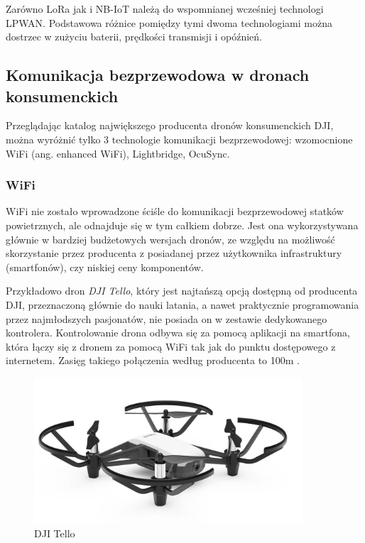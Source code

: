 \hspace{1cm}Zarówno LoRa jak i NB-IoT należą do wspomnianej wcześniej technologi LPWAN. Podstawowa różnice pomiędzy tymi dwoma technologiami można dostrzec w zużyciu baterii, prędkości transmisji i opóźnień.

\subsection{Komunikacja bezprzewodowa w dronach konsumenckich}
\hspace{1cm}Przeglądając katalog największego producenta dronów konsumenckich DJI, można wyróżnić tylko 3 technologie komunikacji bezprzewodowej: wzomocnione WiFi (ang. enhanced WiFi), Lightbridge, OcuSync.

\subsubsection{WiFi}
\hspace{1cm}WiFi nie zostało wprowadzone ściśle do komunikacji bezprzewodowej statków powietrznych, ale odnajduje się w tym całkiem dobrze. Jest ona wykorzystywana głównie w bardziej budżetowych wersjach dronów, ze względu na możliwość skorzystanie przez producenta z posiadanej przez użytkownika infrastruktury (smartfonów), czy niskiej ceny komponentów.

\hspace{1cm}Przykładowo dron \emph{DJI Tello}, który jest najtańszą opcją dostępną od producenta DJI, przeznaczoną głównie do nauki latania, a nawet praktycznie programowania przez najmłodszych pasjonatów, nie posiada on w zestawie dedykowanego kontrolera. Kontrolowanie drona odbywa się za pomocą aplikacji na smartfona, która łączy się z dronem za pomocą WiFi tak jak do punktu dostępowego z internetem. Zasięg takiego połączenia według producenta to 100m \cite{dji-store}.


\begin{figure}[!htbp]
  \centering
  \includegraphics[width=10cm]{./Obrazy/dji-tello.jpg}
  \caption{DJI Tello}
  \end{figure}

